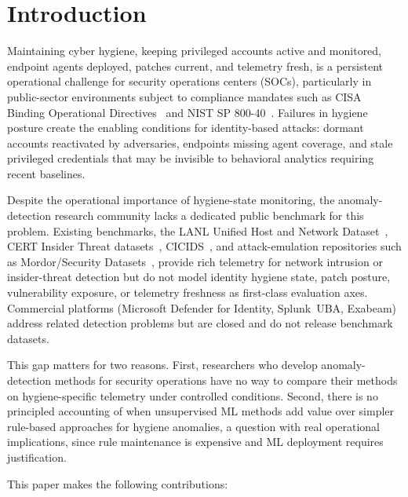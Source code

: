 
\section{Introduction}

Maintaining cyber hygiene, keeping privileged accounts active and monitored,
endpoint agents deployed, patches current, and telemetry fresh, is a persistent
operational challenge for security operations centers (SOCs), particularly in
public-sector environments subject to compliance mandates such as CISA Binding
Operational Directives~\cite{cisa_bod2301_2022} and NIST SP
800-40~\cite{nist_sp80040_2022}. Failures in hygiene posture create the enabling
conditions for identity-based attacks: dormant accounts reactivated by adversaries,
endpoints missing agent coverage, and stale privileged credentials that may be
invisible to behavioral analytics requiring recent baselines.

Despite the operational importance of hygiene-state monitoring, the anomaly-detection
research community lacks a dedicated public benchmark for this problem. Existing
benchmarks, the LANL Unified Host and Network Dataset~\cite{kent2015lanl},
CERT Insider Threat datasets~\cite{glasser2013cert},
CICIDS~\cite{sharafaldin2018cicids},
and attack-emulation repositories such as
Mordor/Security Datasets~\cite{rodriguez2019mordor}, provide rich telemetry for
network intrusion or insider-threat detection but do not model identity hygiene
state, patch posture, vulnerability exposure, or telemetry freshness as first-class
evaluation axes. Commercial platforms (Microsoft Defender for Identity, Splunk~UBA,
Exabeam) address related detection problems but are closed and do not release
benchmark datasets.

This gap matters for two reasons. First, researchers who develop anomaly-detection
methods for security operations have no way to compare their methods on
hygiene-specific telemetry under controlled conditions. Second, there is no
principled accounting of when unsupervised ML methods add value over simpler
rule-based approaches for hygiene anomalies, a question with real operational
implications, since rule maintenance is expensive and ML deployment requires
justification.

This paper makes the following contributions:

